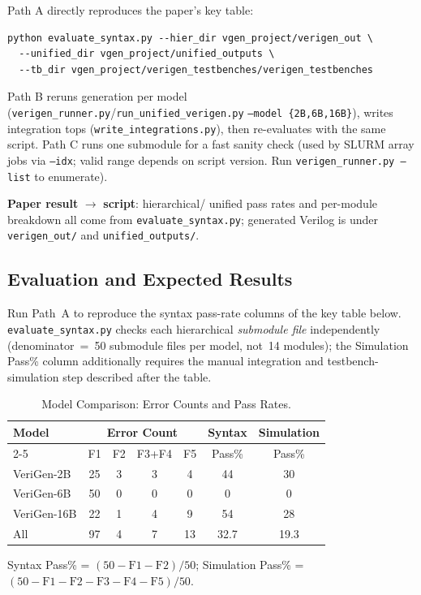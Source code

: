 \documentclass[sigplan,10pt,twocolumn]{acmart}
\begin{document}
\begin{itemize}
Path A directly reproduces the paper's key table:
\begin{lstlisting}
python evaluate_syntax.py --hier_dir vgen_project/verigen_out \
  --unified_dir vgen_project/unified_outputs \
  --tb_dir vgen_project/verigen_testbenches/verigen_testbenches
\end{lstlisting}
Path B reruns generation per model
(\texttt{verigen\_runner.py}/\texttt{run\_unified\_verigen.py}
\texttt{--model \{2B,6B,16B\}}), writes integration tops
(\texttt{write\_integrations.py}), then re-evaluates with the same script.
Path C runs one submodule for a fast sanity check (used by SLURM array
jobs via \texttt{--idx}; valid range depends on script version. Run
\texttt{verigen\_runner.py --list} to enumerate).

\noindent\textbf{Paper result} $\rightarrow$ \textbf{script}: hierarchical/
unified pass rates and per-module breakdown all come from
\texttt{evaluate\_syntax.py}; generated Verilog is under
\texttt{verigen\_out/} and \texttt{unified\_outputs/}.

\subsection{Evaluation and Expected Results}
\label{sec:eval}

Run Path~A to reproduce the syntax pass-rate columns of the key table
below. \texttt{evaluate\_syntax.py} checks each hierarchical
\emph{submodule file} independently (denominator~=~50 submodule files per
model, not~14 modules); the Simulation Pass\% column additionally requires
the manual integration and testbench-simulation step described after the
table.

\begin{table}[h]
\centering\footnotesize
\caption{Model Comparison: Error Counts and Pass Rates.}
\label{tab:expected}
\setlength{\tabcolsep}{4pt}
\begin{tabular}{@{}lcccccc@{}}
\toprule
\multirow{2}{*}{Model} &
\multicolumn{4}{c}{Error Count} &
Syntax & Simulation \\
\cmidrule(lr){2-5}
 & F1 & F2 & F3+F4 & F5 & Pass\% & Pass\% \\
\midrule
VeriGen-2B  & 25 & 3 & 3 & 4 & 44 & 30 \\
VeriGen-6B  & 50 & 0 & 0 & 0 &  0 &  0 \\
VeriGen-16B & 22 & 1 & 4 & 9 & 54 & 28 \\
\midrule
All & 97 & 4 & 7 & 13 & 32.7 & 19.3 \\
\bottomrule
\end{tabular}
\end{table}
\vspace{-6pt}
Syntax Pass\% = $(50-\text{F1}-\text{F2})/50$; Simulation Pass\% =
$(50-\text{F1}-\text{F2}-\text{F3}-\text{F4}-\text{F5})/50$.


\end{itemize}
\end{document}
